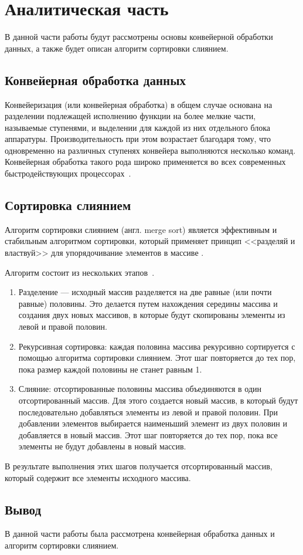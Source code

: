 \chapter{Аналитическая часть}
В данной части работы будут рассмотрены основы конвейерной обработки данных, а также будет описан алгоритм сортировки слиянием.

\section{Конвейерная обработка данных}
Конвейеризация (или конвейерная обработка) в общем случае основана на разделении подлежащей исполнению функции на более мелкие части, называемые ступенями, и выделении для каждой из них отдельного блока аппаратуры.
Производительность при этом возрастает благодаря тому, что одновременно на различных ступенях конвейера выполняются несколько команд.
Конвейерная обработка такого рода широко применяется во всех современных быстродействующих процессорах~\cite{conveyor_desc}.

\section{Сортировка слиянием}
Алгоритм сортировки слиянием (англ. merge sort) является эффективным и стабильным алгоритмом сортировки, который применяет принцип <<разделяй и властвуй>> для упорядочивание элементов в массиве \cite{merge-sort}.

Алгоритм состоит из нескольких этапов~\cite{merge-sort}.
\begin{enumerate}
	\item Разделение ---  исходный массив разделяется на две равные (или почти равные) половины.
	Это делается путем нахождения середины массива и создания двух новых массивов, в которые будут скопированы элементы из левой и правой половин.
	
	\item Рекурсивная сортировка: каждая половина массива рекурсивно сортируется с помощью алгоритма сортировки слиянием.
	Этот шаг повторяется до тех пор, пока размер каждой половины не станет равным 1.
	
	\item Слияние: отсортированные половины массива объединяются в один отсортированный массив.
	Для этого создается новый массив, в который будут последовательно добавляться элементы из левой и правой половин.
	При добавлении элементов выбирается наименьший элемент из двух половин и добавляется в новый массив.
	Этот шаг повторяется до тех пор, пока все элементы не будут добавлены в новый массив.
\end{enumerate}
В результате выполнения этих шагов получается отсортированный массив, который содержит все элементы исходного массива.



\section*{Вывод}
В данной части работы была рассмотрена конвейерная обработка данных и алгоритм сортировки слиянием.
